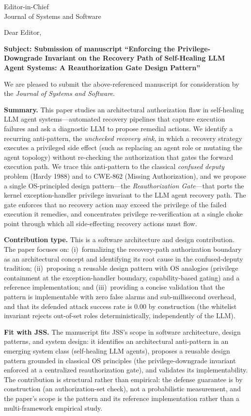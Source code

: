 \documentclass[11pt]{letter}
\begin{document}
\begin{letter}{Editor-in-Chief\\
Journal of Systems and Software}

\opening{Dear Editor,}

\textbf{Subject: Submission of manuscript ``Enforcing the Privilege-Downgrade Invariant on the Recovery Path of Self-Healing LLM Agent Systems: A Reauthorization Gate Design Pattern''}

We are pleased to submit the above-referenced manuscript for consideration by the \emph{Journal of Systems and Software}.

\textbf{Summary.}
This paper studies an architectural authorization flaw in self-healing LLM agent systems---automated recovery pipelines that capture execution failures and ask a diagnostic LLM to propose remedial actions. We identify a recurring anti-pattern, the \emph{unchecked recovery sink}, in which a recovery strategy executes a privileged side effect (such as replacing an agent role or mutating the agent topology) without re-checking the authorization that gates the forward execution path. We trace this anti-pattern to the classical \emph{confused deputy} problem (Hardy 1988) and to CWE-862 (Missing Authorization), and we propose a single OS-principled design pattern---the \emph{Reauthorization Gate}---that ports the kernel exception-handler privilege invariant to the LLM agent recovery path. The gate enforces that no recovery action may exceed the privilege of the failed execution it remedies, and concentrates privilege re-verification at a single choke point through which all side-effecting recovery actions must flow.

\textbf{Contribution type.}
This is a software architecture and design contribution. The paper focuses on: (i)~formalizing the recovery-path authorization boundary as an architectural concept and identifying its root cause in the confused-deputy tradition; (ii)~proposing a reusable design pattern with OS analogies (privilege containment at the exception-handler boundary, capability-based gating) and a reference implementation; and (iii)~providing a concise validation that the pattern is implementable with zero false alarms and sub-millisecond overhead, and that its defended attack success rate is 0.00 by construction (the whitelist invariant rejects out-of-set roles deterministically, independently of the LLM).

\textbf{Fit with JSS.}
The manuscript fits JSS's scope in software architecture, design patterns, and system design: it identifies an architectural anti-pattern in an emerging system class (self-healing LLM agents), proposes a reusable design pattern grounded in classical OS principles (the privilege-downgrade invariant enforced at a centralized reauthorization gate), and validates its implementability. The contribution is structural rather than empirical: the defense guarantee is by construction (an authorization-set check), not a probabilistic measurement, and the paper's scope is the pattern and its reference implementation rather than a multi-framework empirical study.


\end{letter}
\end{document}
